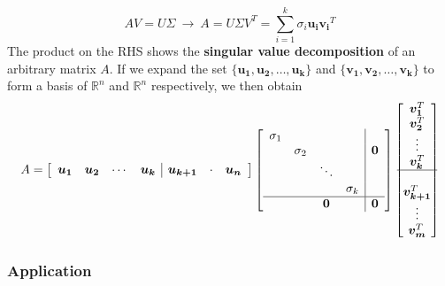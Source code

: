 \documentclass[11pt]{article}
\begin{document}
\begin{equation}
    AV = U\Sigma~\rightarrow~\boxed{A = U\Sigma V^T = \sum_{i=1}^k \sigma_i \bm{u_i}\bm{v_i}^T}
\end{equation}
The product on the RHS shows the \textbf{singular value decomposition} of an arbitrary matrix $A$.
If we expand the set $\{\bm{u_1}, \bm{u_2}, \dots, \bm{u_k}\}$ and $\{\bm{v_1}, \bm{v_2}, \dots, \bm{v_k}\}$ to form a basis of $\mathbb{R}^n$ and $\mathbb{R}^n$ respectively, we then obtain
\begin{equation}
    A = \begin{bmatrix}
        \begin{array}{cccc|ccc}
            \bm{u_1} & \bm{u_2} & \cdots & \bm{u_k} & \bm{u_{k+1}} & \cdot & \bm{u_{n}}
        \end{array}
    \end{bmatrix} \begin{bmatrix} \begin{array}{cccc|c} \sigma_1 & & & & \\
        & \sigma_2 & & & \bm{0} \\
        & & \ddots & & \\ & & & \sigma_k & \\ \hline 
        & & \bm{0} & & \bm{0}
    \end{array} \end{bmatrix} \begin{bmatrix}
        \bm{v_1}^T \\ \bm{v_2}^T \\ \vdots \\ \bm{v_k}^T \\\hline \\ \bm{v_{k+1}}^T \\ \vdots \\ \bm{v_m}^T
    \end{bmatrix}
\end{equation}
\subsubsection{Application}
\end{document}
